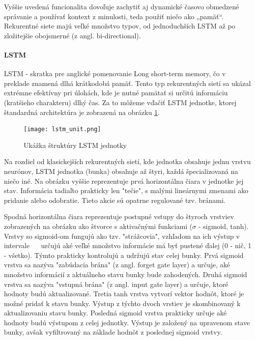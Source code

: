 Vyššie uvedená funcionalita dovoľuje zachytiť aj dynamické časovo obmedzené správanie a používať kontext z minulosti, teda použiť niečo ako „pamäť“. Rekurentné siete majú veľké množstvo typov, od jednoduchších LSTM až po zložitejšie obojsmerné (z angl. bi-directional).

\paragraph{LSTM} 
LSTM\cite{gers1999learning} - skratka pre anglické pomenovanie Long short-term memory, čo v preklade znamená dlhá krátkodobá pamäť. Tento typ rekurentných sietí sa ukázal extrémne efektívny pri úlohách, kde je nutné pamätať si určitú informáciu (kratšieho charakteru) dlhý čas. Za to môžeme vďačiť LSTM jednotke, ktorej štandardná architektúra je zobrazená na obrázku \ref{lstm_unit_image}.

\begin{figure}[H]
	\begin{center}\texttt{[image: lstm\_unit.png]}\end{center}
	\caption[Zobrazenie LSTM jednotky]{Ukážka štruktúry LSTM jednotky\label{lstm_unit_image}\footnotemark}
	
\end{figure}

Na rozdiel od klasickejších rekurentných sietí, kde jednotka obsahuje jednu vrstvu neurónov, LSTM jednotka (bunka) obsahuje až štyri, každá špecializovaná na niečo iné. Na obrázku vyššie reprezentuje prvá horizontálna čiara v jednotke jej stav. Informácia tadiaľto prakticky len "tečie", s malými lineárnymi zmenami ako pridanie alebo odobratie. Tieto akcie sú opatrne regulované tzv. bránami.

Spodná horizontálna čiara reprezentuje postupné vstupy do štyroch vrstviev zobrazených na obrázku ako štvorce s aktivačnými funkciami ($\sigma$ - sigmoid, tanh). Vrstvy so sigmoid-om fungujú ako tzv. "strážcovia", vzhľadom na ich výstup v intervale \ <0,1> \ určujú aké veľké množstvo informácie má byť pustené ďalej (0 - nič, 1 - všetko). Týmto prakticky kontrolujú a udržujú stav celej bunky. Prvá sigmoid vrstva sa nazýva "zabúdacia brána" (z angl. forget gate layer) a určuje, aké množstvo informácií z aktuálneho stavu bunky bude zahodených. Druhá sigmoid vrstva sa nazýva "vstupná brána" (z angl. input gate layer) a určuje, ktoré hodnoty budú aktualizované. Tretia tanh vrstva vytvorí vektor hodnôt, ktoré je možné pridať k stavu bunky. Výstup z týchto dvoch vrstiev je skombinovaný k aktualizovaniu stavu bunky. Posledná sigmoid vrstva prakticky určuje aké hodnoty budú výstupom z celej jednotky. Výstup je založený na upravenom stave bunky, avšak vyfiltrovaný na základe hodnôt z poslednej sigmoid vrstvy.

